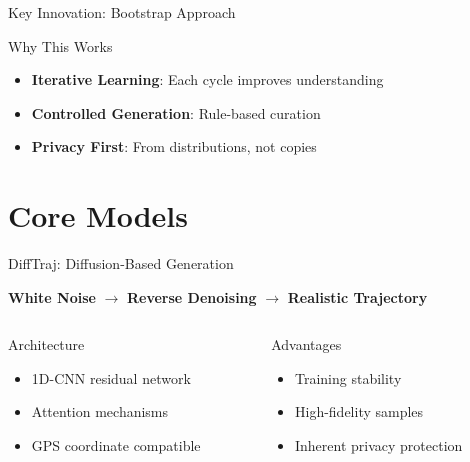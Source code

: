 \documentclass[aspectratio=169,xcolor={dvipsnames}]{beamer}
\begin{document}
\begin{frame}{Key Innovation: Bootstrap Approach}
  \begin{block}{Why This Works}
    \begin{itemize}
      \item \textbf{Iterative Learning}: Each cycle improves understanding
      \item \textbf{Controlled Generation}: Rule-based curation
      \item \textbf{Privacy First}: From distributions, not copies
    \end{itemize}
  \end{block}
\end{frame}

\section{Core Models}

\begin{frame}{DiffTraj: Diffusion-Based Generation}
  \begin{block}{}
    \centering
    \Large \textbf{White Noise} $\rightarrow$ \textbf{Reverse Denoising} $\rightarrow$ \textbf{Realistic Trajectory}
  \end{block}
  
  \vspace{1em}
  \begin{columns}[T,onlytextwidth]
    \begin{column}{0.48\textwidth}
      \begin{block}{Architecture}
        \begin{itemize}
          \item 1D-CNN residual network
          \item Attention mechanisms
          \item GPS coordinate compatible
        \end{itemize}
      \end{block}
    \end{column}
    \hspace{0.04\textwidth}
    \begin{column}{0.48\textwidth}
      \begin{block}{Advantages}
        \begin{itemize}
          \item Training stability
          \item High-fidelity samples
          \item Inherent privacy protection
        \end{itemize}
      \end{block}
    \end{column}
  \end{columns}
\end{frame}
\end{document}
